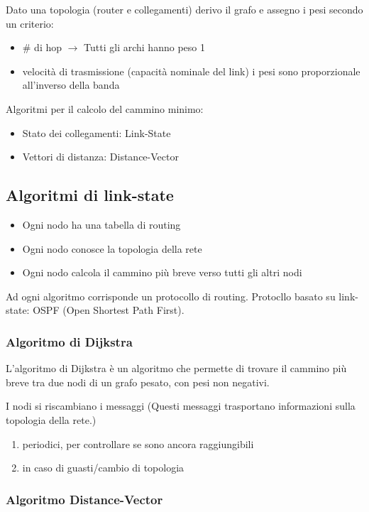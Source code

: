 \documentclass[a4paper]{article}
\begin{document}
\vspace{1em}
\noindent
Dato una topologia (router e collegamenti) derivo il grafo e assegno i pesi secondo un criterio:
\begin{itemize}
  \item \# di hop $\rightarrow$ Tutti gli archi hanno peso 1
  \item velocità di trasmissione (capacità nominale del link) i pesi sono proporzionale all'inverso della banda
\end{itemize}
Algoritmi per il calcolo del cammino minimo:
\begin{itemize}
  \item Stato dei collegamenti: Link-State
  \item Vettori di distanza: Distance-Vector
\end{itemize}


\subsection{Algoritmi di link-state}
\begin{itemize}
  \item Ogni nodo ha una tabella di routing
  \item Ogni nodo conosce la topologia della rete
  \item Ogni nodo calcola il cammino più breve verso tutti gli altri nodi
\end{itemize}
Ad ogni algoritmo corrisponde un protocollo di routing. Protocllo basato su link-state: OSPF (Open Shortest Path First). 
\subsubsection{Algoritmo di Dijkstra}

\begin{definition}
  L'algoritmo di Dijkstra è un algoritmo che permette di trovare il cammino più breve tra due nodi di un grafo pesato, con pesi non negativi.
\end{definition}
\noindent
I nodi si riscambiano i messaggi (Questi messaggi trasportano informazioni sulla topologia della rete.)
\begin{enumerate}
  \item periodici, per controllare se sono ancora raggiungibili
  \item in caso di guasti/cambio di topologia
\end{enumerate}

\subsubsection{Algoritmo Distance-Vector}
\end{document}
